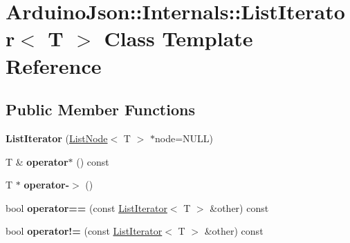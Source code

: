 \hypertarget{class_arduino_json_1_1_internals_1_1_list_iterator}{}\section{Arduino\+Json\+:\+:Internals\+:\+:List\+Iterator$<$ T $>$ Class Template Reference}
\label{class_arduino_json_1_1_internals_1_1_list_iterator}
\subsection*{Public Member Functions}
\begin{DoxyCompactItemize}
\item 
\hypertarget{class_arduino_json_1_1_internals_1_1_list_iterator_aa9f2fd9b3be020a40764fc24e2435b0a}{}{\bfseries List\+Iterator} (\hyperlink{struct_arduino_json_1_1_internals_1_1_list_node}{List\+Node}$<$ T $>$ $\ast$node=N\+U\+L\+L)\label{class_arduino_json_1_1_internals_1_1_list_iterator_aa9f2fd9b3be020a40764fc24e2435b0a}

\item 
\hypertarget{class_arduino_json_1_1_internals_1_1_list_iterator_a64252b2b759171d7e9dccd38548a5ea7}{}T \& {\bfseries operator$\ast$} () const \label{class_arduino_json_1_1_internals_1_1_list_iterator_a64252b2b759171d7e9dccd38548a5ea7}

\item 
\hypertarget{class_arduino_json_1_1_internals_1_1_list_iterator_abda1d47194335611e6696f50a82f79a7}{}T $\ast$ {\bfseries operator-\/$>$} ()\label{class_arduino_json_1_1_internals_1_1_list_iterator_abda1d47194335611e6696f50a82f79a7}

\item 
\hypertarget{class_arduino_json_1_1_internals_1_1_list_iterator_af04982ed9940f52b701860b1b4de97cf}{}bool {\bfseries operator==} (const \hyperlink{class_arduino_json_1_1_internals_1_1_list_iterator}{List\+Iterator}$<$ T $>$ \&other) const \label{class_arduino_json_1_1_internals_1_1_list_iterator_af04982ed9940f52b701860b1b4de97cf}

\item 
\hypertarget{class_arduino_json_1_1_internals_1_1_list_iterator_acea1211ac8992c6776c7a34cb0a68573}{}bool {\bfseries operator!=} (const \hyperlink{class_arduino_json_1_1_internals_1_1_list_iterator}{List\+Iterator}$<$ T $>$ \&other) const \label{class_arduino_json_1_1_internals_1_1_list_iterator_acea1211ac8992c6776c7a34cb0a68573}


\end{DoxyCompactItemize}
